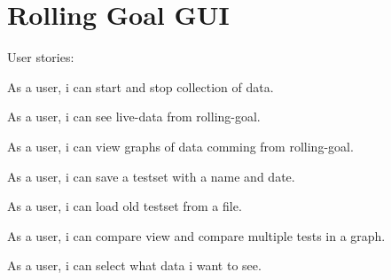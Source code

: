 \section{Rolling Goal GUI}

User stories:

As a user, i can start and stop collection of data.

As a user, i can see live-data from rolling-goal.

As a user, i can view graphs of data comming from rolling-goal.

As a user, i can save a testset with a name and date.

As a user, i can load old testset from a file.

As a user, i can compare view and compare multiple tests in a graph.

As a user, i can select what data i want to see.